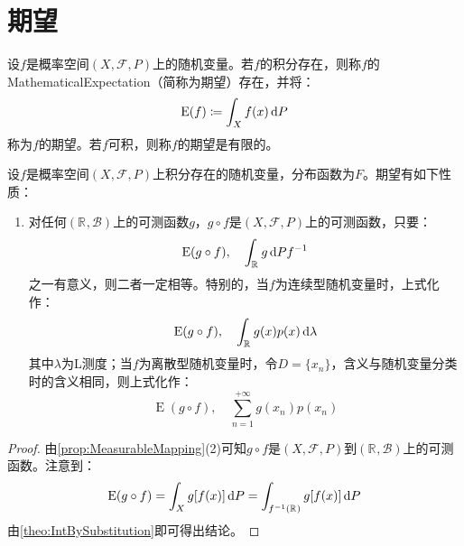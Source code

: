 \section{期望}

\begin{definition}
	设$f$是概率空间$(X,\mathscr{F},P)$上的随机变量。若$f$的积分存在，则称$f$的\gls{MathematicalExpectation}（简称为期望）存在，并将：
	\begin{equation*}
		\operatorname{E}(f)\coloneq\int_{X}f(x)\mathop{}\!\mathrm{d} P
	\end{equation*}
	称为$f$的期望。若$f$可积，则称$f$的期望是有限的。
\end{definition}
\begin{property}
	设$f$是概率空间$(X,\mathscr{F},P)$上积分存在的随机变量，分布函数为$F$。期望有如下性质：
	\begin{enumerate}
		\item 对任何$(\mathbb{R}^{},\mathcal{B})$上的可测函数$g$，$g\circ f$是$(X,\mathscr{F},P)$上的可测函数，只要：
		\begin{equation*}
			\operatorname{E}(g\circ f),\quad\int_{\mathbb{R}^{}}g\mathop{}\!\mathrm{d} Pf^{-1}
		\end{equation*}
		之一有意义，则二者一定相等。特别的，当$f$为连续型随机变量时，上式化作：
		\begin{equation*}
			\operatorname{E}(g\circ f),\quad\int_{\mathbb{R}^{}}g(x)p(x)\mathop{}\!\mathrm{d}\lambda
		\end{equation*}
		其中$\lambda$为L测度；当$f$为离散型随机变量时，令$D=\{x_n\}$，含义与随机变量分类时的含义相同，则上式化作：
		\begin{equation*}
				\operatorname{E}(g\circ f),\quad\sum_{n=1}^{+\infty}g(x_n)p(x_n)
		\end{equation*}
	\end{enumerate}
\end{property}
\begin{proof}
	由\cref{prop:MeasurableMapping}(2)可知$g\circ f$是$(X,\mathscr{F},P)$到$(\mathbb{R}^{},\mathcal{B})$上的可测函数。注意到：
	\begin{equation*}
		\operatorname{E}(g\circ f)=\int_{X}g[f(x)]\mathop{}\!\mathrm{d} P=\int_{f^{-1}(\mathbb{R}^{})}g[f(x)]\mathop{}\!\mathrm{d} P
	\end{equation*}
	由\cref{theo:IntBySubstitution}即可得出结论。
\end{proof}
